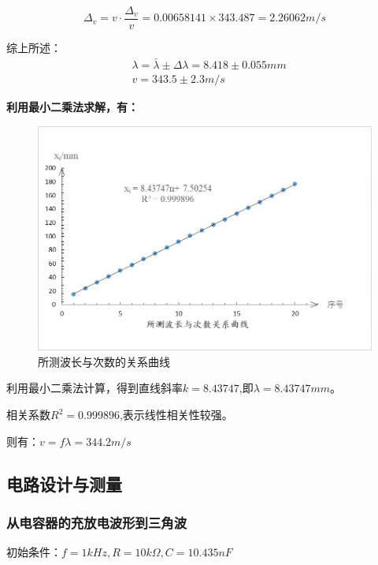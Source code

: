 \documentclass[UTF8]{ctexart}
\begin{document}
$$
\Delta_v=v\cdot\frac{\Delta_{v}}{v} =0.00658141\times343.487=2.26062m/s
$$

\noindent 综上所述：
\begin{align}
    &\lambda=\bar{\lambda} \pm \Delta \lambda=8.418\pm 0.055 mm\nonumber\\
    &v=343.5\pm 2.3 m/s\nonumber
\end{align}

\noindent \textbf{利用最小二乘法求解，有：}
\begin{figure}[h]
    \centering
    \includegraphics[scale=0.75]{波长拟合曲线.png}
    \caption{所测波长与次数的关系曲线}
    \label{fig:label}
\end{figure}

利用最小二乘法计算，得到直线斜率$k=8.43747$,即$\lambda=8.43747mm$。

相关系数$R^2=0.999896$,表示线性相关性较强。

则有：$v=f\lambda=344.2m/s $

\subsection{电路设计与测量}
\subsubsection{从电容器的充放电波形到三角波}

初始条件：$f=1kHz,R=10k\Omega,C=10.435nF$
\end{document}

